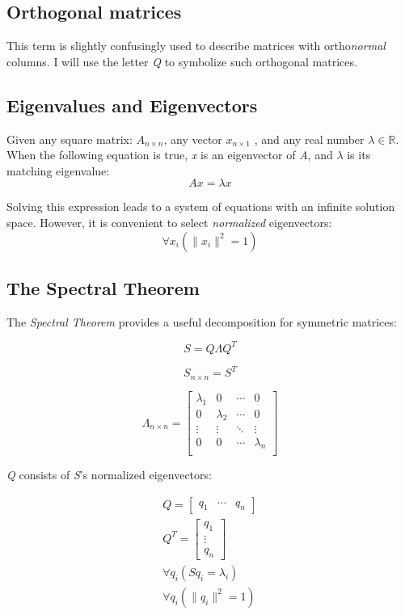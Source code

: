 \documentclass[12pt]{article}
\theoremstyle{definition}
\begin{document}
\subsection{Orthogonal matrices}
This term is slightly confusingly used to describe matrices with ortho\textit{normal} columns. I will use the letter \textit{Q} to symbolize such orthogonal matrices.


\subsection{Eigenvalues and Eigenvectors}

Given any square matrix: $A_{n\times n}$,
any vector $x_{n\times 1}$ , and any real number $\lambda \in \mathbb{R}$. \\
When the following equation is true, \textit{x} is an eigenvector of \textit{A}, and $\lambda$ is its matching eigenvalue:
\[A x = \lambda x\]


Solving this expression leads to a system of equations with an infinite solution space.
However, it is convenient to select \textit{normalized} eigenvectors:
$$\forall x_i \left(\|x_i\|^2 = 1\right)$$


\subsection{The Spectral Theorem}

The \textit{Spectral Theorem} provides a useful decomposition for symmetric matrices:

\begin{equation}
	S = Q \Lambda Q^T
	\label{eq:Spectral}
\end{equation}

$$S_{n\times n} = S^T$$

\[
\Lambda_{n\times n} =
\left[ {\begin{array}{cccc}
		\lambda_{1} & 0 & \cdots & 0       \\
		0 & \lambda_{2} & \cdots & 0 \\
		\vdots & \vdots   & \ddots & \vdots	\\
		0 & 0 & \cdots  & \lambda_{n}\\
\end{array} } \right]
\]

\textit{Q} consists of \textit{S}'s normalized eigenvectors:

\begin{align*}
	Q = \left[ {\begin{array}{ccc}
			q_1 & \cdots  & q_n
	\end{array}} \right] \\
	Q^T = \left[ {\begin{array}{c}
			q_1 \\ \vdots  \\ q_n
	\end{array}} \right] \\
	\forall q_i \left( S q_i = \lambda_i \right) \\
	\forall q_i \left( \| q_i \|^2 = 1 \right)
\end{align*}
\end{document}
